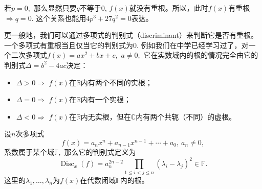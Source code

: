 若$p = 0,$ 那么显然只要$q$不等于0, $f(x)$就没有重根。所以，此时$f(x)$有重根$\Rightarrow q = 0.$ 这个关系也能用$4p^3 + 27q^2 = 0$表达。

\vspace{1em}

更一般地，我们可以通过多项式的判别式（discriminant）来判断它是否有重根。一个多项式有重根当且仅当它的判别式为0. 例如我们在中学已经学习过了，对一个二次多项式$f(x) = ax^2 + bx + c,$ $a \neq 0,$ 它在实数域内的根的情况完全由它的判别式$\Delta = b^2 - 4ac$决定：
\begin{itemize}
\item $\Delta > 0 \Rightarrow$ $f(x)$在$\mathbb{R}$内有两个不同的实根；
\item $\Delta = 0 \Rightarrow$ $f(x)$在$\mathbb{R}$内有一个实根；
\item $\Delta < 0 \Rightarrow$ $f(x)$在$\mathbb{R}$内无实根，但在$\mathbb{C}$内有两个共轭（不同）的虚根。
\end{itemize}

设$n$次多项式
$$
f(x) = a_{n}x^{n} + a_{n-1}x^{n-1} + \cdots + a_{0}, ~ a_n \neq 0,
$$
系数属于某个域$\mathbb{F},$ 那么它的判别式定义为
$$\operatorname{Disc}_x(f) = a_n^{2n-2} \prod_{1 \leqslant i < j \leqslant n} (\lambda_i - \lambda_j)^2 \in \mathbb{F}.$$
这里的$\lambda_1, \ldots, \lambda_n$为$f(x)$在代数闭域$\bar{\mathbb{F}}$内的根。

